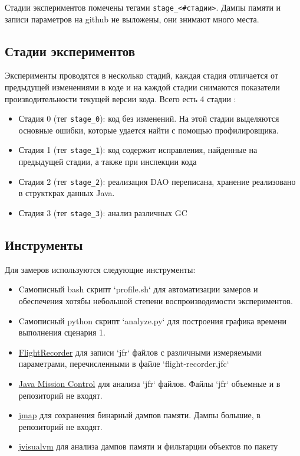 \documentclass{article}
\begin{document}
		Стадии экспериментов помечены тегами \texttt{stage\_<\#стадии>}. Дампы памяти и записи параметров на github не выложены, они знимают много места.


	\subsection*{Стадии экспериментов}
		Эксперименты проводятся в несколько стадий, каждая стадия отличается от предыдущей изменениями в коде и на каждой стадии снимаются показатели производительности текущей версии кода. Всего есть 4 стадии :
		\begin{itemize}
			\item  Стадия 0 (тег \texttt{stage\_0}): код без изменений. На этой стадии выделяются основные ошибки, которые удается найти с помощью профилировщика.
			\item Стадия 1 (тег \texttt{stage\_1}): код содержит исправления, найденные на предыдущей стадии, а также при инспекции кода
			\item Стадия 2 (тег \texttt{stage\_2}): реализация DAO переписана, хранение реализовано в структкрах данных Java.
			\item Стадия 3 (тег \texttt{stage\_3}): анализ различных GC
		\end{itemize}

	\subsection*{Инструменты}
		Для замеров используются следующие инструменты:
		\begin{itemize}
			\item Cамописный bash скрипт `profile.sh` для автоматизации замеров и обеспечения хотябы небольшой степени воспроизводимости экспериментов.
			\item Cамописный python скрипт `analyze.py` для построения графика времени выполнения сценария 1.
			\item \href{https://docs.oracle.com/javacomponents/jmc-5-5/jfr-runtime-guide/about.html}{FlightRecorder} для записи `jfr` файлов с различными измеряемыми параметрами, перечисленными в файле `flight-recorder.jfc`
			\item \href{https://www.oracle.com/technetwork/java/javaseproducts/mission-control/index.html}{Java Mission Control} для анализа `jfr` файлов. Файлы `jfr` объемные и в репозиторий не входят.
			\item \href{https://docs.oracle.com/javase/8/docs/technotes/tools/unix/jmap.html}{jmap} для сохранения бинарный дампов памяти. Дампы большие, в репозиторий не входят.
			\item \href{https://docs.oracle.com/javase/8/docs/technotes/guides/visualvm/index.html}{jvisualvm} для анализа дампов памяти и фильтарции объектов по пакету
		\end{itemize}
	
\end{document}
